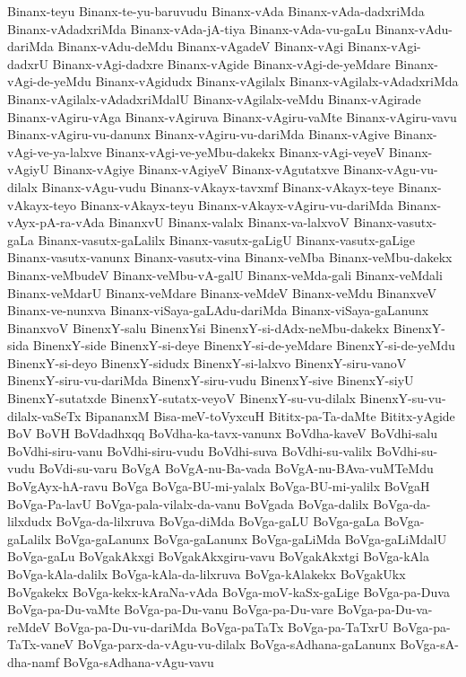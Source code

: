 {Binanx-teyu
Binanx-te-yu-baruvudu
Binanx-vAda
Binanx-vAda-dadxriMda
Binanx-vAdadxriMda
Binanx-vAda-jA-tiya
Binanx-vAda-vu-gaLu
Binanx-vAdu-dariMda
Binanx-vAdu-deMdu
Binanx-vAgadeV
Binanx-vAgi
Binanx-vAgi-dadxrU
Binanx-vAgi-dadxre
Binanx-vAgide
Binanx-vAgi-de-yeMdare
Binanx-vAgi-de-yeMdu
Binanx-vAgidudx
Binanx-vAgilalx
Binanx-vAgilalx-vAdadxriMda
Binanx-vAgilalx-vAdadxriMdalU
Binanx-vAgilalx-veMdu
Binanx-vAgirade
Binanx-vAgiru-vAga
Binanx-vAgiruva
Binanx-vAgiru-vaMte
Binanx-vAgiru-vavu
Binanx-vAgiru-vu-danunx
Binanx-vAgiru-vu-dariMda
Binanx-vAgive
Binanx-vAgi-ve-ya-lalxve
Binanx-vAgi-ve-yeMbu-dakekx
Binanx-vAgi-veyeV
Binanx-vAgiyU
Binanx-vAgiye
Binanx-vAgiyeV
Binanx-vAgutatxve
Binanx-vAgu-vu-dilalx
Binanx-vAgu-vudu
Binanx-vAkayx-tavxmf
Binanx-vAkayx-teye
Binanx-vAkayx-teyo
Binanx-vAkayx-teyu
Binanx-vAkayx-vAgiru-vu-dariMda
Binanx-vAyx-pA-ra-vAda
BinanxvU
Binanx-valalx
Binanx-va-lalxvoV
Binanx-vasutx-gaLa
Binanx-vasutx-gaLalilx
Binanx-vasutx-gaLigU
Binanx-vasutx-gaLige
Binanx-vasutx-vanunx
Binanx-vasutx-vina
Binanx-veMba
Binanx-veMbu-dakekx
Binanx-veMbudeV
Binanx-veMbu-vA-galU
Binanx-veMda-gali
Binanx-veMdali
Binanx-veMdarU
Binanx-veMdare
Binanx-veMdeV
Binanx-veMdu
BinanxveV
Binanx-ve-nunxva
Binanx-viSaya-gaLAdu-dariMda
Binanx-viSaya-gaLanunx
BinanxvoV
BinenxY-salu
BinenxYsi
BinenxY-si-dAdx-neMbu-dakekx
BinenxY-sida
BinenxY-side
BinenxY-si-deye
BinenxY-si-de-yeMdare
BinenxY-si-de-yeMdu
BinenxY-si-deyo
BinenxY-sidudx
BinenxY-si-lalxvo
BinenxY-siru-vanoV
BinenxY-siru-vu-dariMda
BinenxY-siru-vudu
BinenxY-sive
BinenxY-siyU
BinenxY-sutatxde
BinenxY-sutatx-veyoV
BinenxY-su-vu-dilalx
BinenxY-su-vu-dilalx-vaSeTx
BipananxM
Bisa-meV-toVyxcuH
Bititx-pa-Ta-daMte
Bititx-yAgide
BoV
BoVH
BoVdadhxqq
BoVdha-ka-tavx-vanunx
BoVdha-kaveV
BoVdhi-salu
BoVdhi-siru-vanu
BoVdhi-siru-vudu
BoVdhi-suva
BoVdhi-su-valilx
BoVdhi-su-vudu
BoVdi-su-varu
BoVgA
BoVgA-nu-Ba-vada
BoVgA-nu-BAva-vuMTeMdu
BoVgAyx-hA-ravu
BoVga
BoVga-BU-mi-yalalx
BoVga-BU-mi-yalilx
BoVgaH
BoVga-Pa-lavU
BoVga-pala-vilalx-da-vanu
BoVgada
BoVga-dalilx
BoVga-da-lilxdudx
BoVga-da-lilxruva
BoVga-diMda
BoVga-gaLU
BoVga-gaLa
BoVga-gaLalilx
BoVga-gaLanunx
BoVga-gaLanunx
BoVga-gaLiMda
BoVga-gaLiMdalU
BoVga-gaLu
BoVgakAkxgi
BoVgakAkxgiru-vavu
BoVgakAkxtgi
BoVga-kAla
BoVga-kAla-dalilx
BoVga-kAla-da-lilxruva
BoVga-kAlakekx
BoVgakUkx
BoVgakekx
BoVga-kekx-kAraNa-vAda
BoVga-moV-kaSx-gaLige
BoVga-pa-Duva
BoVga-pa-Du-vaMte
BoVga-pa-Du-vanu
BoVga-pa-Du-vare
BoVga-pa-Du-va-reMdeV
BoVga-pa-Du-vu-dariMda
BoVga-paTaTx
BoVga-pa-TaTxrU
BoVga-pa-TaTx-vaneV
BoVga-parx-da-vAgu-vu-dilalx
BoVga-sAdhana-gaLanunx
BoVga-sA-dha-namf
BoVga-sAdhana-vAgu-vavu
}

